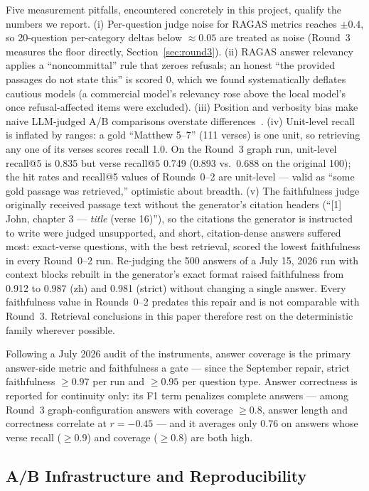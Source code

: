 Five measurement pitfalls, encountered concretely in this project,
qualify the numbers we report. (i) Per-question judge noise for RAGAS
metrics reaches $\pm 0.4$, so 20-question per-category deltas below
$\approx 0.05$ are treated as noise (Round~3 measures the floor
directly, Section~\ref{sec:round3}). (ii) RAGAS answer relevancy
applies a ``noncommittal'' rule that zeroes refusals; an honest ``the
provided passages do not state this'' is scored 0, which we found
systematically deflates cautious models (a commercial model's relevancy
rose above the local model's once refusal-affected items were excluded).
(iii) Position and verbosity bias make naive LLM-judged A/B comparisons
overstate differences~\cite{zeng2025unbiased}. (iv) Unit-level recall
is inflated by ranges: a gold ``Matthew 5--7'' (111 verses) is one unit,
so retrieving any one of its verses scores recall 1.0. On the Round~3
graph run, unit-level recall@5 is 0.835 but verse recall@5 0.749 (0.893
vs.\ 0.688 on the original 100); the hit rates and recall@5 values of
Rounds~0--2 are unit-level --- valid as ``some gold passage was
retrieved,'' optimistic about breadth. (v) The faithfulness judge
originally received passage text without the generator's citation
headers (``[1] John, chapter 3 --- \emph{title} (verse 16)''), so the
citations the generator is instructed to write were judged unsupported,
and short, citation-dense answers suffered most: exact-verse questions,
with the best retrieval, scored the lowest faithfulness in every
Round~0--2 run. Re-judging the 500 answers of a July 15, 2026 run with
context blocks rebuilt in the generator's exact format raised
faithfulness from 0.912 to 0.987 (zh) and 0.981 (strict) without
changing a single answer. Every faithfulness value in
Rounds~0--2 predates this repair and is not comparable with Round~3.
Retrieval conclusions in this paper therefore rest on the deterministic
family wherever possible.

Following a July 2026 audit of the instruments, answer coverage is the
primary answer-side metric and faithfulness a gate --- since the
September repair, strict faithfulness $\ge 0.97$ per run and $\ge 0.95$
per question type. Answer correctness is reported
for continuity only: its F1 term penalizes complete answers --- among
Round~3 graph-configuration answers with coverage $\ge 0.8$, answer
length and correctness correlate at $r=-0.45$ --- and it averages only
0.76 on answers whose verse recall ($\ge 0.9$) and coverage
($\ge 0.8$) are both high.

\subsection{A/B Infrastructure and Reproducibility}
\label{sec:evalinfra}

